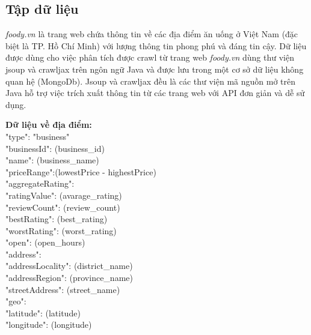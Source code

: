 \documentclass[12pt]{extarticle}
\begin{document}
		\subsection{Tập dữ liệu}
			\par \textit{foody.vn} là trang web chứa thông tin về các địa điểm ăn uống ở Việt Nam (đặc biệt là TP. Hồ Chí Minh) với lượng thông tin phong phú và đáng tin cậy. Dữ liệu được dùng cho việc phân tích được crawl từ trang web \textit{foody.vn} dùng thư viện jsoup và crawljax trên ngôn ngữ Java và được lưu trong một cơ sở dữ liệu không quan hệ (MongoDb). Jsoup và crawljax đều là các thư viện mã nguồn mở trên Java hỗ trợ việc trích xuất thông tin từ các trang web với API đơn giản và dễ sử dụng.
			\par \textbf{Dữ liệu về địa điểm:}\\
				"type": "business"\\
				"businessId": (business\_id)\\
				"name": (business\_name)\\
				"priceRange":(lowestPrice - highestPrice)\\
				"aggregateRating":\\
				\hspace*{1.5cm}"ratingValue": (avarage\_rating)\\
				\hspace*{1.5cm}"reviewCount": (review\_count)\\
				\hspace*{1.5cm}"bestRating": (best\_rating)\\
				\hspace*{1.5cm}"worstRating": (worst\_rating)\\
				"open": (open\_hours)\\
				"address": \\
				\hspace*{1.5cm}"addressLocality": (district\_name)\\
				\hspace*{1.5cm}"addressRegion": (province\_name)\\
				\hspace*{1.5cm}"streetAddress": (street\_name)\\
				"geo":\\
				\hspace*{1.5cm}"latitude": (latitude)\\
				\hspace*{1.5cm}"longitude": (longitude)\\
\end{document}
